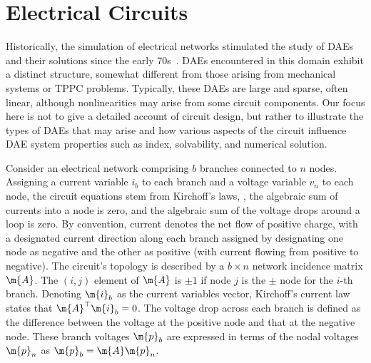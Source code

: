 \section{Electrical Circuits}
\label{chap5:sec:electrical_circuits}

Historically, the simulation of electrical networks stimulated the study of \acp{DAE} and their solutions since the early 70s~\cite{gear1971simultaneous}. \acp{DAE} encountered in this domain exhibit a distinct structure, somewhat different from those arising from mechanical systems or \ac{TPPC} problems. Typically, these \acp{DAE} are large and sparse, often linear, although nonlinearities may arise from some circuit components. Our focus here is not to give a detailed account of circuit design, but rather to illustrate the types of \acp{DAE} that may arise and how various aspects of the circuit influence \ac{DAE} system properties such as index, solvability, and numerical solution.

Consider an electrical network comprising $b$ branches connected to $n$ nodes. Assigning a current variable $i_b$ to each branch and a voltage variable $v_n$ to each node, the circuit equations stem from Kirchoff's laws, \ie{}, the algebraic sum of currents into a node is zero, and the algebraic sum of the voltage drops around a loop is zero. By convention, current denotes the net flow of positive charge, with a designated current direction along each branch assigned by designating one node as negative and the other as positive (with current flowing from positive to negative). The circuit's topology is described by a $b \times n$ network incidence matrix $\m{A}$. The $(i,j)$ element of $\m{A}$ is $\pm1$ if node $j$ is the $\pm$ node for the $i$-th branch. Denoting $\m{i}_b$ as the current variables vector, Kirchoff's current law states that $\m{A}^\top\m{i}_b = 0$. The voltage drop across each branch is defined as the difference between the voltage at the positive node and that at the negative node. These branch voltages $\m{p}_b$ are expressed in terms of the nodal voltages $\m{p}_n$ as $\m{p}_b = \m{A}\m{p}_n$.

